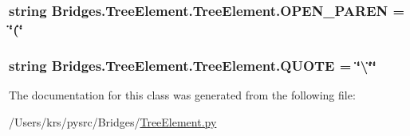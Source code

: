 \subsubsection[{O\+P\+E\+N\+\_\+\+P\+A\+R\+E\+N}]{\setlength{\rightskip}{0pt plus 5cm}string Bridges.\+Tree\+Element.\+Tree\+Element.\+O\+P\+E\+N\+\_\+\+P\+A\+R\+E\+N = \char`\"{}(\char`\"{}\hspace{0.3cm}{\ttfamily [static]}}\label{class_bridges_1_1_tree_element_1_1_tree_element_a7fdab53f2a56df22ca48438a170563d4}
\hypertarget{class_bridges_1_1_tree_element_1_1_tree_element_a9c4b0517bdd82b0f000c818ced4733c3}{}
\subsubsection[{Q\+U\+O\+T\+E}]{\setlength{\rightskip}{0pt plus 5cm}string Bridges.\+Tree\+Element.\+Tree\+Element.\+Q\+U\+O\+T\+E = \char`\"{}\textbackslash{}\char`\"{}\char`\"{}\hspace{0.3cm}{\ttfamily [static]}}\label{class_bridges_1_1_tree_element_1_1_tree_element_a9c4b0517bdd82b0f000c818ced4733c3}


The documentation for this class was generated from the following file\+:\begin{DoxyCompactItemize}
\item 
/\+Users/krs/pysrc/\+Bridges/\hyperlink{_tree_element_8py}{Tree\+Element.\+py}\end{DoxyCompactItemize}
